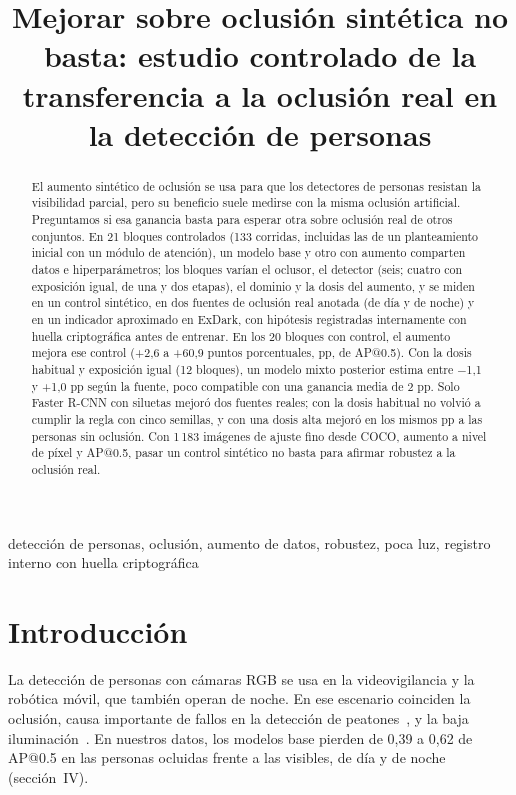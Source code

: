 \documentclass[conference]{IEEEtran}
\begin{document}
\title{Mejorar sobre oclusión sintética no basta: estudio controlado de la transferencia a la oclusión real en la detección de personas}

\author{
}

\maketitle

\begin{abstract}
El aumento sintético de oclusión se usa para que los detectores de personas resistan la visibilidad parcial, pero su beneficio suele medirse con la misma oclusión artificial. Preguntamos si esa ganancia basta para esperar otra sobre oclusión real de otros conjuntos. En 21 bloques controlados (133 corridas, incluidas las de un planteamiento inicial con un módulo de atención), un modelo base y otro con aumento comparten datos e hiperparámetros; los bloques varían el oclusor, el detector (seis; cuatro con exposición igual, de una y dos etapas), el dominio y la dosis del aumento, y se miden en un control sintético, en dos fuentes de oclusión real anotada (de día y de noche) y en un indicador aproximado en ExDark, con hipótesis registradas internamente con huella criptográfica antes de entrenar. En los 20 bloques con control, el aumento mejora ese control (+2,6 a +60,9 puntos porcentuales, pp, de AP@0.5). Con la dosis habitual y exposición igual (12 bloques), un modelo mixto posterior estima entre $-$1,1 y +1,0 pp según la fuente, poco compatible con una ganancia media de 2 pp. Solo Faster R-CNN con siluetas mejoró dos fuentes reales; con la dosis habitual no volvió a cumplir la regla con cinco semillas, y con una dosis alta mejoró en los mismos pp a las personas sin oclusión. Con 1\,183 imágenes de ajuste fino desde COCO, aumento a nivel de píxel y AP@0.5, pasar un control sintético no basta para afirmar robustez a la oclusión real.
\end{abstract}

\begin{IEEEkeywords}
detección de personas, oclusión, aumento de datos, robustez, poca luz, registro interno con huella criptográfica
\end{IEEEkeywords}

\section{Introducción}
La detección de personas con cámaras RGB se usa en la videovigilancia y la robótica móvil, que también operan de noche. En ese escenario coinciden la oclusión, causa importante de fallos en la detección de peatones~\cite{Dollar2012}, y la baja iluminación~\cite{Loh2019}. En nuestros datos, los modelos base pierden de 0,39 a 0,62 de AP@0.5 en las personas ocluidas frente a las visibles, de día y de noche (sección~IV).
\end{document}

